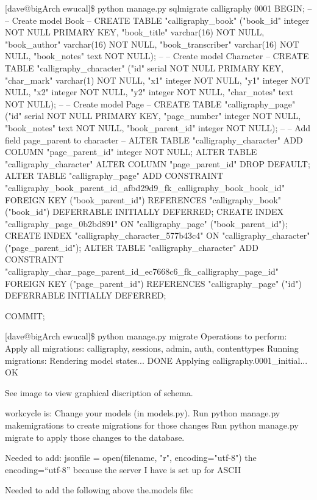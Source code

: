 [dave@bigArch ewucal]\$ python manage.py sqlmigrate calligraphy 0001
BEGIN;
--
-- Create model Book
--
CREATE TABLE "calligraphy_book" ("book_id" integer NOT NULL PRIMARY KEY, "book_title" varchar(16) NOT NULL, "book_author" varchar(16) NOT NULL, "book_transcriber" varchar(16) NOT NULL, "book_notes" text NOT NULL);
--
-- Create model Character
--
CREATE TABLE "calligraphy_character" ("id" serial NOT NULL PRIMARY KEY, "char_mark" varchar(1) NOT NULL, "x1" integer NOT NULL, "y1" integer NOT NULL, "x2" integer NOT NULL, "y2" integer NOT NULL, "char_notes" text NOT NULL);
--
-- Create model Page
--
CREATE TABLE "calligraphy_page" ("id" serial NOT NULL PRIMARY KEY, "page_number" integer NOT NULL, "book_notes" text NOT NULL, "book_parent_id" integer NOT NULL);
--
-- Add field page_parent to character
--
ALTER TABLE "calligraphy_character" ADD COLUMN "page_parent_id" integer NOT NULL;
ALTER TABLE "calligraphy_character" ALTER COLUMN "page_parent_id" DROP DEFAULT;
ALTER TABLE "calligraphy_page" ADD CONSTRAINT "calligraphy_book_parent_id_afbd29d9_fk_calligraphy_book_book_id" FOREIGN KEY ("book_parent_id") REFERENCES "calligraphy_book" ("book_id") DEFERRABLE INITIALLY DEFERRED;
CREATE INDEX "calligraphy_page_0b2bd891" ON "calligraphy_page" ("book_parent_id");
CREATE INDEX "calligraphy_character_577b43c4" ON "calligraphy_character" ("page_parent_id");
ALTER TABLE "calligraphy_character" ADD CONSTRAINT "calligraphy_char_page_parent_id_ec7668c6_fk_calligraphy_page_id" FOREIGN KEY ("page_parent_id") REFERENCES "calligraphy_page" ("id") DEFERRABLE INITIALLY DEFERRED;

COMMIT;

[dave@bigArch ewucal]\$ python manage.py migrate
Operations to perform:
  Apply all migrations: calligraphy, sessions, admin, auth, contenttypes
Running migrations:
  Rendering model states... DONE
  Applying calligraphy.0001_initial... OK

See image to view graphical discription of schema.

workcycle is:  
Change your models (in models.py).
Run python manage.py makemigrations to create migrations for those changes
Run python manage.py migrate to apply those changes to the database.



  
  
Needed to add:     jsonfile = open(filename, "r", encoding="utf-8") the encoding=``utf-8'' because the server I have is set up for ASCII

Needed to add the following above the.models file:

